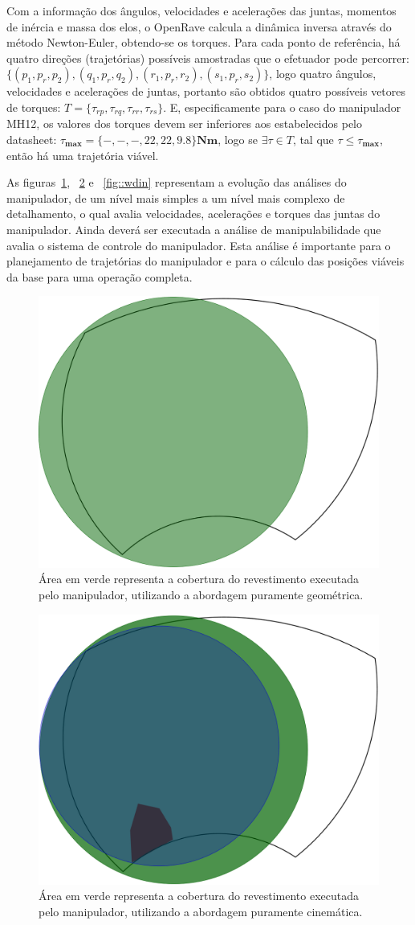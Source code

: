 Com a informação dos ângulos, velocidades e acelerações das juntas, momentos
de inércia e massa dos elos, o OpenRave calcula a dinâmica inversa através do
método Newton-Euler, obtendo-se os torques. Para cada ponto de referência, há quatro direções
(trajetórias) possíveis amostradas que o efetuador pode percorrer:
$\{(p_1,p_r,p_2),(q_1,p_r,q_2),(r_1,p_r,r_2),(s_1,p_r,s_2)\}$, logo quatro
ângulos, velocidades e acelerações de juntas, portanto são obtidos quatro
possíveis vetores de torques:
$T=\{\tau_{rp},\tau_{rq},\tau_{rr},\tau_{rs}\}$. E, especificamente para o
caso do manipulador MH12, os valores dos torques devem ser inferiores aos
estabelecidos pelo datasheet:
$\tau_{\textbf{max}}=\{-,-,-,22,22,9.8\}\textbf{Nm}$, logo se $\exists \tau\in
T$, tal que $\tau\leq\tau_{\textbf{max}}$, então há uma trajetória viável.

As figuras~\ref{fig::wgeo}, ~\ref{fig::wcin} e ~\ref{fig::wdin} representam a
evolução das análises do manipulador, de um nível mais simples a um nível mais
complexo de detalhamento, o qual avalia velocidades, acelerações e torques das
juntas do manipulador. Ainda deverá ser executada a análise de manipulabilidade
que avalia o sistema de controle do manipulador. Esta análise é importante para
o planejamento de trajetórias do manipulador e para o cálculo das posições
viáveis da base para uma operação completa.



\begin{figure}[h!]
	\centering	
	\includegraphics[width=0.5\columnwidth]{detail/figs/dinamica/workspaceGeometrico.png}
	\caption{Área em verde representa a cobertura do revestimento executada pelo
	manipulador, utilizando a abordagem puramente geométrica.}
	\label{fig::wgeo}
\end{figure}

\begin{figure}[h!]	
	\centering
	\includegraphics[width=0.5\columnwidth]{detail/figs/dinamica/workspaceCinematica.png}
	\caption{Área em verde representa a cobertura do revestimento executada pelo
	manipulador, utilizando a abordagem puramente cinemática.}
	\label{fig::wcin}
\end{figure}

